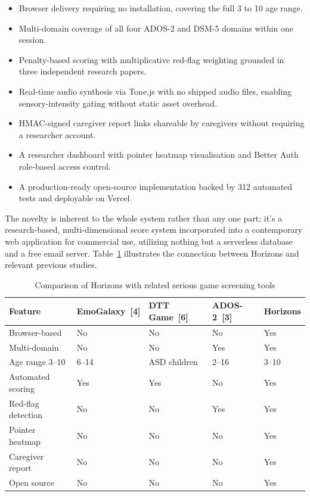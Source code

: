 \documentclass[12pt,a4paper,oneside]{report}
\begin{document}
\begin{itemize}[leftmargin=0.5in]
  \item Browser delivery requiring no installation, covering the full 3 to 10 age range.
  \item Multi-domain coverage of all four ADOS-2 and DSM-5 domains within one session.
  \item Penalty-based scoring with multiplicative red-flag weighting grounded in three independent research papers.
  \item Real-time audio synthesis via Tone.js with no shipped audio files, enabling sensory-intensity gating without static asset overhead.
  \item HMAC-signed caregiver report links shareable by caregivers without requiring a researcher account.
  \item A researcher dashboard with pointer heatmap visualisation and Better Auth role-based access control.
  \item A production-ready open-source implementation backed by 312 automated tests and deployable on Vercel.
\end{itemize}

The novelty is inherent to the whole system rather than any one part; it’s a research-based, multi-dimensional score system incorporated into a contemporary web application for commercial use, utilizing nothing but a serverless database and a free email server. Table~\ref{tab:novelty} illustrates the connection between Horizons and relevant previous studies.

\begin{table}[t]
  \caption{Comparison of Horizons with related serious game screening tools}
  \label{tab:novelty}
  \begin{tabularx}{\linewidth}{lXXXX}
    \toprule
    \textbf{Feature} & \textbf{EmoGalaxy~[4]} & \textbf{DTT Game~[6]} & \textbf{ADOS-2~[3]} & \textbf{Horizons} \\
    \midrule
    Browser-based        & No     & No     & No     & Yes    \\
    Multi-domain         & No     & No     & Yes    & Yes    \\
    Age range 3--10      & 6--14  & ASD children & 2--16 & 3--10 \\
    Automated scoring    & Yes    & Yes    & No     & Yes    \\
    Red-flag detection   & No     & No     & Yes    & Yes    \\
    Pointer heatmap      & No     & No     & No     & Yes    \\
    Caregiver report     & No     & No     & No     & Yes    \\
    Open source          & No     & No     & No     & Yes    \\
    \bottomrule
  \end{tabularx}
\end{table}
\end{document}

